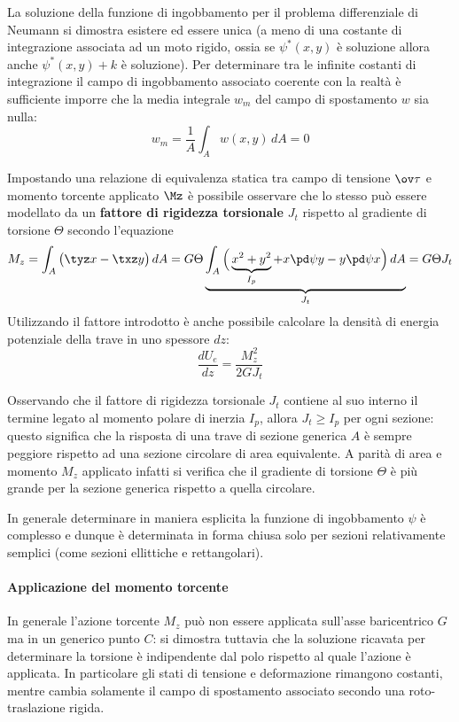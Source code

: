     	La soluzione della funzione di ingobbamento per il problema differenziale di Neumann si dimostra esistere ed essere unica (a meno di una costante di integrazione associata ad un moto rigido, ossia se $\psi^*(x,y)$ è soluzione allora anche $\psi^*(x,y) + k$ è soluzione). Per determinare tra le infinite costanti di integrazione il campo di ingobbamento associato coerente con la realtà è sufficiente imporre  che la media integrale $w_m$ del campo di spostamento $w$ sia nulla:
    	\[ w_m = \frac 1 A \int_A w(x,y)\, dA = 0 \]
    	
    	\begin{concetto}
    		Impostando una relazione di equivalenza statica tra campo di tensione $\ov \tau$ e momento torcente applicato $\Mz$ è possibile osservare che lo stesso può essere modellato da un \textbf{fattore di rigidezza torsionale} $J_t$ rispetto al gradiente di torsione $\Theta$ secondo l'equazione
    		\begin{equation}
    			M_z = \int_A\big(\tyz x  - \txz y\big)\, dA = G\Theta \underbrace{\int_A \Big( \underbrace{x^2 + y^2}_{I_p} + x \pd \psi y - y \pd \psi x \Big)\, dA}_{J_t} = G\Theta J_t
    		\end{equation}
    		Utilizzando il fattore introdotto è anche possibile calcolare la densità di energia potenziale della trave in uno spessore $dz$:
    		\begin{equation}
    			\frac{dU_e}{dz} = \frac{M_z^2}{2GJ_t}
    		\end{equation}
    		
    	\end{concetto}
    	\begin{osservazione}
    		Osservando che il fattore di rigidezza torsionale $J_t$ contiene al suo interno il termine legato al momento polare di inerzia $I_p$, allora $J_t \geq I_p$ per ogni sezione: questo significa che la risposta di una trave di sezione generica $A$ è sempre peggiore rispetto ad una sezione circolare di area equivalente. A parità di area e momento $M_z$ applicato infatti si verifica che il gradiente di torsione $\Theta$ è più grande per la sezione generica rispetto a quella circolare.
    	\end{osservazione}
    	In generale determinare in maniera esplicita la funzione di ingobbamento $\psi$ è complesso e dunque è determinata in forma chiusa solo per sezioni relativamente semplici (come sezioni ellittiche e rettangolari).
    	
    	\paragraph{Applicazione del momento torcente} In generale l'azione torcente $M_z$ può non essere applicata sull'asse baricentrico $G$ ma in un generico punto $C$: si dimostra tuttavia che la soluzione ricavata per determinare la torsione è indipendente dal polo rispetto al quale l'azione è applicata. In particolare gli stati di tensione e deformazione rimangono costanti, mentre cambia solamente il campo di spostamento associato secondo una roto-traslazione rigida.
    	
